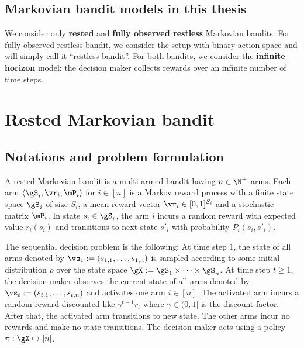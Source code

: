 \subsection*{Markovian bandit models in this thesis}

We consider only \textbf{rested} and \textbf{fully observed restless} Markovian bandits.
For fully observed restless bandit, we consider the setup with binary action space and will simply call it ``restless bandit''.
For both bandits, we consider the \textbf{infinite horizon} model: the decision maker collects rewards over an infinite number of time steps.

\section{Rested Markovian bandit}
\label{ch:mb:sec:rested}


\subsection{Notations and problem formulation}
\label{ssec:rested_formul}

A rested Markovian bandit is a multi-armed bandit having $n\in\N^+$ arms.
Each arm $\langle\gS_i, \vr_i, \mP_i\rangle$ for $i\in[n]$ is a Markov reward process with a finite state space $\gS_i$ of size $S_i$, a mean reward vector $\vr_i\in[0,1]^{S_i}$ and a stochastic matrix $\mP_i$.
In state $s_i\in\gS_i$, the arm $i$ incurs a random reward with expected value $r_i(s_i)$ and transitions to next state $s'_i$ with probability $P_i(s_i,s'_i)$.

The sequential decision problem is the following: At time step $1$, the state of all arms denoted by $\vs_1:=(s_{1,1},\dots,s_{1,n})$ is sampled according to some initial distribution $\rho$ over the state space $\gX:=\gS_1\times\dots\times\gS_n$.
At time step $t\ge1$, the decision maker observes the current state of all arms denoted by $\vs_t:=(s_{t,1},\dots,s_{t,n})$ and activates one arm $i\in[n]$.
The activated arm incurs a random reward discounted like $\gamma^{t-1}r_t$ where $\gamma\in(0,1]$ is the discount factor.
After that, the activated arm transitions to new state. %
The other arms incur no rewards and make no state transitions.
The decision maker acts using a policy $\pi:\gX\mapsto[n]$. 

